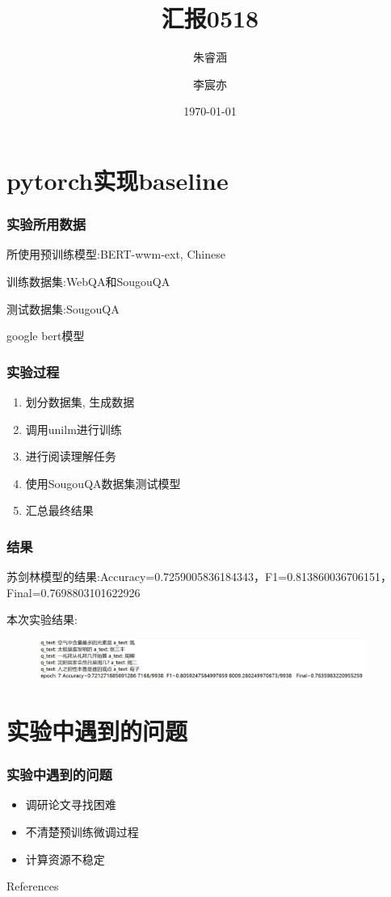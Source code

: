 \documentclass{beamer}
\title{汇报0518}
\institute{项目三}
\author{朱睿涵 \and 李宸亦}
\date{\today}
\begin{document}
\frame{\titlepage} %


\section{pytorch实现baseline}
\begin{frame}
    \frametitle{实验所用数据}
    所使用预训练模型:BERT-wwm-ext, Chinese

    训练数据集:WebQA和SougouQA

    测试数据集:SougouQA

    google bert模型
\end{frame}

\begin{frame}
    \frametitle{实验过程}
    \begin{enumerate}
        \item 划分数据集, 生成数据
        \item 调用unilm进行训练
        \item 进行阅读理解任务
        \item 使用SougouQA数据集测试模型
        \item 汇总最终结果
    \end{enumerate}
\end{frame}



\begin{frame}
    \frametitle{结果}
    苏剑林模型的结果:Accuracy=0.7259005836184343，F1=0.813860036706151，Final=0.7698803101622926

    本次实验结果:
    \begin{figure}
        \centering
        \includegraphics[width=0.95\textwidth]{./fig/result.png}
    \end{figure}

\end{frame}


\section{实验中遇到的问题}
\begin{frame}
    \frametitle{实验中遇到的问题}
    \begin{itemize}
        \item 调研论文寻找困难
        \item 不清楚预训练微调过程
        \item 计算资源不稳定
    \end{itemize}


\end{frame}

\begin{frame}{References}

    \nocite{*}
    
    

\end{frame}
\end{document}
